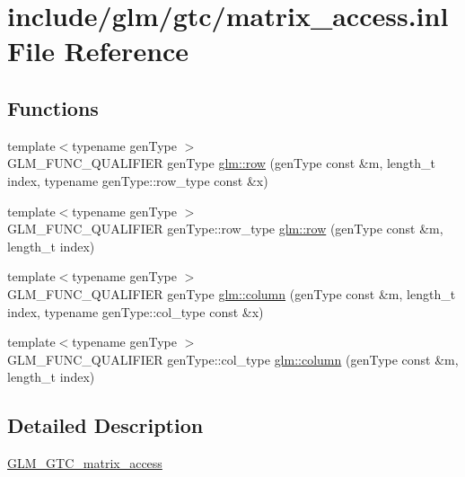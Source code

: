 \hypertarget{matrix__access_8inl}{}\section{include/glm/gtc/matrix\+\_\+access.inl File Reference}
\label{matrix__access_8inl}
\subsection*{Functions}
\begin{DoxyCompactItemize}
\item 
{\footnotesize template$<$typename gen\+Type $>$ }\\G\+L\+M\+\_\+\+F\+U\+N\+C\+\_\+\+Q\+U\+A\+L\+I\+F\+I\+ER gen\+Type \hyperlink{group__gtc__matrix__access_gaadcc64829aadf4103477679e48c7594f}{glm\+::row} (gen\+Type const \&m, length\+\_\+t index, typename gen\+Type\+::row\+\_\+type const \&x)
\item 
{\footnotesize template$<$typename gen\+Type $>$ }\\G\+L\+M\+\_\+\+F\+U\+N\+C\+\_\+\+Q\+U\+A\+L\+I\+F\+I\+ER gen\+Type\+::row\+\_\+type \hyperlink{group__gtc__matrix__access_ga259e5ebd0f31ec3f83440f8cae7f5dba}{glm\+::row} (gen\+Type const \&m, length\+\_\+t index)
\item 
{\footnotesize template$<$typename gen\+Type $>$ }\\G\+L\+M\+\_\+\+F\+U\+N\+C\+\_\+\+Q\+U\+A\+L\+I\+F\+I\+ER gen\+Type \hyperlink{group__gtc__matrix__access_ga9e757377523890e8b80c5843dbe4dd15}{glm\+::column} (gen\+Type const \&m, length\+\_\+t index, typename gen\+Type\+::col\+\_\+type const \&x)
\item 
{\footnotesize template$<$typename gen\+Type $>$ }\\G\+L\+M\+\_\+\+F\+U\+N\+C\+\_\+\+Q\+U\+A\+L\+I\+F\+I\+ER gen\+Type\+::col\+\_\+type \hyperlink{group__gtc__matrix__access_ga96022eb0d3fae39d89fc7a954e59b374}{glm\+::column} (gen\+Type const \&m, length\+\_\+t index)
\end{DoxyCompactItemize}


\subsection{Detailed Description}
\hyperlink{group__gtc__matrix__access}{G\+L\+M\+\_\+\+G\+T\+C\+\_\+matrix\+\_\+access} 